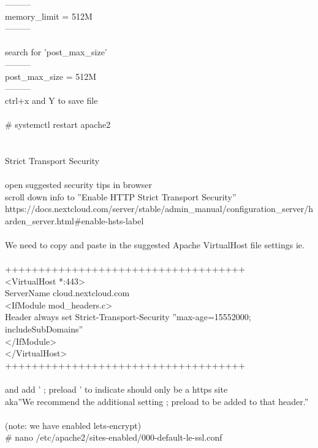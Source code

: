 \documentclass[10pt,a4paper]{article}
\begin{document}
{		---------\\
		memory\_limit = 512M\\
		---------\\
\\
		search for 'post\_max\_size'\\
		---------\\
		post\_max\_size = 512M\\
		---------\\
		ctrl+x and Y to save file\\
	\\
		\# systemctl restart apache2\\
\\
\\
	Strict Transport Security\\
\\
		open suggested security tips in browser\\
		scroll down info to ''Enable HTTP Strict Transport Security''\\
		https://docs.nextcloud.com/server/stable/admin\_manual/configuration\_server/harden\_server.html\#enable-hsts-label}{\large \\
\\
		We need to copy and paste in the suggested Apache VirtualHost file settings ie.\\
\\
				++++++++++++++++++++++++++++++++++++\\
				<VirtualHost *:443>\\
  					ServerName cloud.nextcloud.com\\
    						<IfModule mod\_headers.c>\\
      							Header always set Strict-Transport-Security ''max-age=15552000; includeSubDomains''\\
    						</IfModule>\\
 				</VirtualHost>\\
				++++++++++++++++++++++++++++++++++++\\
\\
		and add ' ; preload ' to indicate should only be a https site \\
		aka''We recommend the additional setting ; preload to be added to that header.''\\
\\
		(note: we have enabled lets-encrypt)\\
		\# nano /etc/apache2/sites-enabled/000-default-le-ssl.conf}{\large \\
		\\
}
\end{document}
